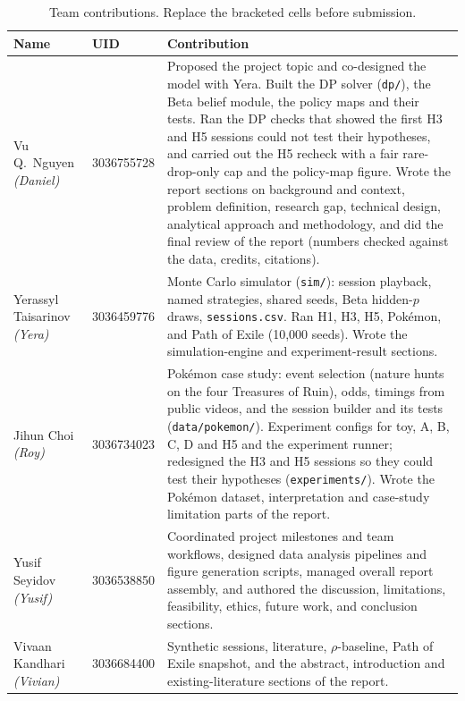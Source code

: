 \documentclass[11pt,a4paper]{article}
\begin{document}
\begin{table}[H]
\centering
\caption{Team contributions. Replace the bracketed cells before submission.}
\label{tab:contrib}
\small
\renewcommand{\arraystretch}{1.15}
\begin{tabularx}{\textwidth}{@{}l l X@{}}
\toprule
\textbf{Name} & \textbf{UID} & \textbf{Contribution} \\
\midrule
Vu Q.\ Nguyen \textit{(Daniel)}
& 3036755728
& Proposed the project topic and co-designed the model with Yera. Built the DP solver (\texttt{dp/}), the Beta belief module, the policy maps and their tests. Ran the DP checks that showed the first H3 and H5 sessions could not test their hypotheses, and carried out the H5 recheck with a fair rare-drop-only cap and the policy-map figure. Wrote the report sections on background and context, problem definition, research gap, technical design, analytical approach and methodology, and did the final review of the report (numbers checked against the data, credits, citations). \\
\addlinespace
Yerassyl Taisarinov \textit{(Yera)}
& 3036459776
& Monte Carlo simulator (\texttt{sim/}): session playback, named strategies, shared seeds, Beta hidden-$p$ draws, \texttt{sessions.csv}. Ran H1, H3, H5, Pok\'emon, and Path of Exile (10{,}000 seeds). Wrote the simulation-engine and experiment-result sections. \\
\addlinespace
Jihun Choi \textit{(Roy)}
& 3036734023
& Pok\'emon case study: event selection (nature hunts on the four Treasures of Ruin), odds, timings from public videos, and the session builder and its tests (\texttt{data/pokemon/}). Experiment configs for toy, A, B, C, D and H5 and the experiment runner; redesigned the H3 and H5 sessions so they could test their hypotheses (\texttt{experiments/}). Wrote the Pok\'emon dataset, interpretation and case-study limitation parts of the report. \\
\addlinespace
Yusif Seyidov \textit{(Yusif)}
& 3036538850
& Coordinated project milestones and team workflows, designed data analysis pipelines and figure generation scripts, managed overall report assembly, and authored the discussion, limitations, feasibility, ethics, future work, and conclusion sections. \\
\addlinespace
Vivaan Kandhari \textit{(Vivian)}
& 3036684400
& Synthetic sessions, literature, $\rho$-baseline, Path of Exile snapshot, and the abstract, introduction and existing-literature sections of the report. \\
\bottomrule
\end{tabularx}
\end{table}
\end{document}
